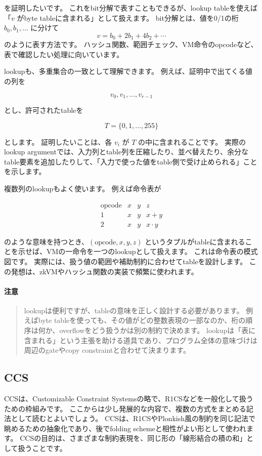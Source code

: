 \documentclass[a4paper,11pt]{ltjsarticle}
\newenvironment{warnbox}{%
  \paragraph*{注意}\begin{quote}
}{%
  \end{quote}
}
\begin{document}
を証明したいです。
これをbit分解で表すこともできるが、lookup tableを使えば「\(v\) がbyte tableに含まれる」として扱えます。
bit分解とは、値を0/1の桁 \(b_0,b_1,\ldots\) に分けて
\[
  v=b_0+2b_1+4b_2+\cdots
\]
のように表す方法です。
ハッシュ関数、範囲チェック、VM命令のopcodeなど、表で確認したい処理に向いています。

lookupも、多重集合の一致として理解できます。
例えば、証明中で出てくる値の列を

\[
  v_0,v_1,\ldots,v_{r-1}
\]

とし、許可されたtableを

\[
  T=\{0,1,\ldots,255\}
\]

とします。
証明したいことは、各 \(v_i\) が \(T\) の中に含まれることです。
実際のlookup argumentでは、入力列とtable列を圧縮したり、並べ替えたり、余分なtable要素を追加したりして、「入力で使った値をtable側で受け止められる」ことを示します。

複数列のlookupもよく使います。
例えば命令表が

\[
\begin{array}{c|ccc}
\text{opcode} & x & y & z\\
\hline
1 & x & y & x+y\\
2 & x & y & x\cdot y
\end{array}
\]

のような意味を持つとき、\((\text{opcode},x,y,z)\) というタプルがtableに含まれることを示せば、VMの一命令を一つのlookupとして扱えます。
これは命令表の模式図です。
実際には、扱う値の範囲や補助制約に合わせてtableを設計します。
この発想は、zkVMやハッシュ関数の実装で頻繁に使われます。

\begin{warnbox}
lookupは便利ですが、tableの意味を正しく設計する必要があります。
例えばbyte tableを使っても、その値がどの整数表現の一部なのか、桁の順序は何か、overflowをどう扱うかは別の制約で決めます。
lookupは「表に含まれる」という主張を助ける道具であり、プログラム全体の意味づけは周辺のgateやcopy constraintと合わせて決まります。
\end{warnbox}

\subsection{CCS}

CCSは、Customizable Constraint Systemsの略で、R1CSなどを一般化して扱うための枠組みです。
ここからは少し発展的な内容で、複数の方式をまとめる記法として読むとよいでしょう。
CCSは、R1CSやPlonkish風の制約を同じ記法で眺めるための抽象化であり、後でfolding schemeと相性がよい形として使われます。
CCSの目的は、さまざまな制約表現を、同じ形の「線形結合の積の和」として扱うことです。
\end{document}
